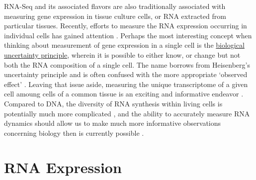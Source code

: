 
RNA-Seq and its associated flavors are also traditionally associated with measuring gene expression in tissue culture cells, or RNA extracted from particular tissues. Recently, efforts to measure the RNA expression occurring in individual cells has gained attention \citep{Shapiro2013b}. Perhaps the most interesting concept when thinking about measurement of gene expression in a single cell is the \underline{biological uncertainty principle}, wherein it is possible to either know, or change \textemdash but not both \textemdash the RNA composition of a single cell. The name borrows from Heisenberg's uncertainty principle \citep{Kennard1927} and is often confused with the more appropriate ‘observed effect’ \citep{Riley2013}. Leaving that issue aside, measuring the unique transcriptome of a given cell amoung cells of a common tissue is an exciting and informative endeavor \citep{Shalek2013b,Wills2013}. Compared to DNA, the diversity of RNA synthesis within living cells is potentially much more complicated \citep{Shendure2012}, and the ability to accurately measure RNA dynamics should allow us to make much more informative observations concerning biology then is currently possible \citep{Djebali2012}.


\section{RNA Expression}

